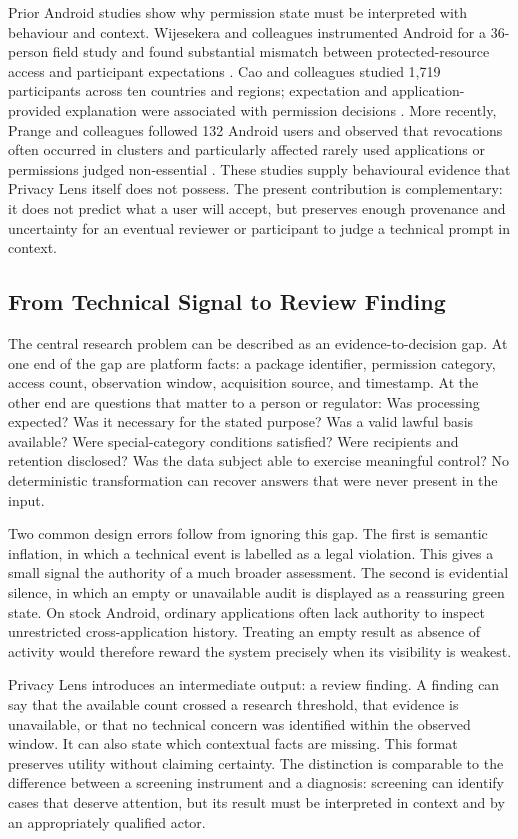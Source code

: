 Prior Android studies show why permission state must be interpreted with behaviour and context. Wijesekera and colleagues instrumented Android for a 36-person field study and found substantial mismatch between protected-resource access and participant expectations \cite{wijesekera2015}. Cao and colleagues studied 1,719 participants across ten countries and regions; expectation and application-provided explanation were associated with permission decisions \cite{cao2021}. More recently, Prange and colleagues followed 132 Android users and observed that revocations often occurred in clusters and particularly affected rarely used applications or permissions judged non-essential \cite{prange2024}. These studies supply behavioural evidence that Privacy Lens itself does not possess. The present contribution is complementary: it does not predict what a user will accept, but preserves enough provenance and uncertainty for an eventual reviewer or participant to judge a technical prompt in context.

\subsection{From Technical Signal to Review Finding}

The central research problem can be described as an evidence-to-decision gap. At one end of the gap are platform facts: a package identifier, permission category, access count, observation window, acquisition source, and timestamp. At the other end are questions that matter to a person or regulator: Was processing expected? Was it necessary for the stated purpose? Was a valid lawful basis available? Were special-category conditions satisfied? Were recipients and retention disclosed? Was the data subject able to exercise meaningful control? No deterministic transformation can recover answers that were never present in the input.

Two common design errors follow from ignoring this gap. The first is semantic inflation, in which a technical event is labelled as a legal violation. This gives a small signal the authority of a much broader assessment. The second is evidential silence, in which an empty or unavailable audit is displayed as a reassuring green state. On stock Android, ordinary applications often lack authority to inspect unrestricted cross-application history. Treating an empty result as absence of activity would therefore reward the system precisely when its visibility is weakest.

Privacy Lens introduces an intermediate output: a review finding. A finding can say that the available count crossed a research threshold, that evidence is unavailable, or that no technical concern was identified within the observed window. It can also state which contextual facts are missing. This format preserves utility without claiming certainty. The distinction is comparable to the difference between a screening instrument and a diagnosis: screening can identify cases that deserve attention, but its result must be interpreted in context and by an appropriately qualified actor.

